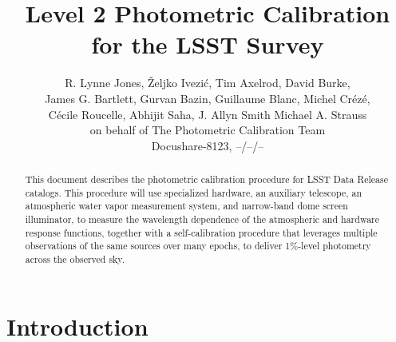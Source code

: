 \documentclass[12pt,preprint]{aastex}
\begin{document}
\title{Level 2 Photometric Calibration for the LSST Survey}

\author{
R. Lynne Jones, {\v Z}eljko Ivezi{\'c},  Tim Axelrod, David Burke, \\
James G. Bartlett, 
Gurvan Bazin,
Guillaume Blanc, 
Michel Cr{\'e}z{\'e}, \\ 
C{\'e}cile Roucelle, 
Abhijit Saha, 
J. Allyn Smith
Michael A. Strauss \\
on behalf of 
The Photometric Calibration Team \\ 
Docushare-8123, --/--/-- \\
}



\begin{abstract}
This document describes the photometric calibration procedure for LSST
Data Release catalogs. This procedure will use specialized hardware, 
an auxiliary telescope, an atmospheric water vapor measurement system, and narrow-band dome screen illuminator, to
measure the wavelength dependence of the atmospheric and hardware
response functions, together with a self-calibration procedure that
leverages multiple observations of the same sources over many epochs,
to deliver 1\%-level photometry across the observed sky.
\end{abstract}

\tableofcontents

\section{Introduction}
\end{document}
